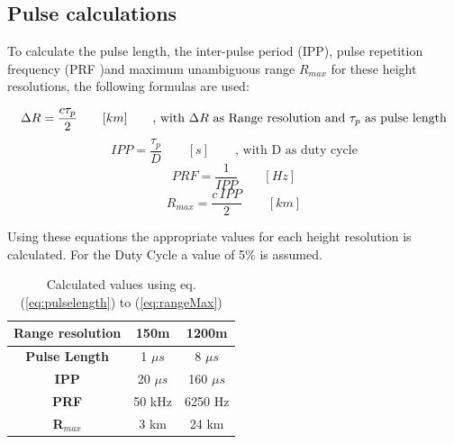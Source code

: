 \subsection{Pulse calculations}
To calculate the pulse length, the inter-pulse period (IPP), pulse repetition frequency (PRF )and maximum unambiguous range 	$R_{max}$ for these height resolutions, the following formulas are used:

\begin{center}
\begin{equation}
\centering
\label{eq:pulselength}
	\Delta R = \frac{c \tau_p }{2} \qquad [km] \qquad \textrm{, with } \Delta R \textrm{ as Range resolution and } \tau_p \textrm{ as pulse length}
\end{equation}
\begin{equation}
\label{eq:ipp}
	{IPP} = \frac{\tau_p }{D} \qquad [s] \qquad \textrm{, with D as duty cycle}
\end{equation}
\begin{equation}
\label{eq:prf}
	PRF = \frac{1}{IPP} \qquad [Hz]
\end{equation}
\begin{equation}
\label{eq:rangeMax}
	R_{max} = \frac{c \,  {IPP} }{2} \qquad [km]
\end{equation}
\end{center}

Using these equations the appropriate values for each height resolution is calculated. For the Duty Cycle a value of 5\% is assumed.

\begin{center}
\begin{table}
\label{tab:range}
	\caption{Calculated values using eq. (\ref{eq:pulselength}) to (\ref{eq:rangeMax})}
\begin{center}
\begin{tabular}{ |c | c | c|}
	\hline
	\textbf{Range resolution} & \textbf{150m} & \textbf{1200m} \\
	\hline
	\textbf{Pulse Length} & 1 $\mu s$ & 8 $\mu s$ \\
	\textbf{IPP} & 20 $\mu s$  & 160 $\mu s$ \\
	\textbf{PRF} & 50 kHz & 6250 Hz\\
	\textbf{ R$_{max}$} & 3 km & 24 km\\
	\hline	
\end{tabular}
\end{center}
\end{table}
\end{center}


